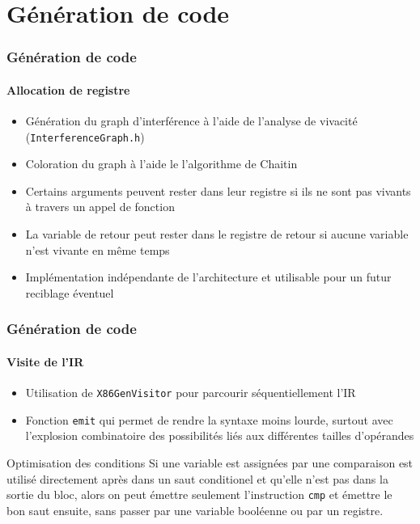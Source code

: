 \documentclass{beamer}
\begin{document}
\section{Génération de code}

\begin{frame}
    \frametitle{Génération de code}
    \framesubtitle{Allocation de registre}

    \begin{itemize}
        \item Génération du graph d'interférence à l'aide de l'analyse de vivacité (\lstinline{InterferenceGraph.h})
        \item Coloration du graph à l'aide le l'algorithme de Chaitin
        \item Certains arguments peuvent rester dans leur registre si ils ne sont pas vivants à
              travers un appel de fonction
        \item La variable de retour peut rester dans le registre de retour si aucune variable n'est 
              vivante en même temps
        \item Implémentation indépendante de l'architecture et utilisable pour un futur
              reciblage éventuel
    \end{itemize}
\end{frame}

\begin{frame}
    \frametitle{Génération de code}
    \framesubtitle{Visite de l'IR}

    \begin{itemize}
        \item Utilisation de \lstinline{X86GenVisitor} pour parcourir séquentiellement l'IR
        \item Fonction \lstinline{emit} qui permet de rendre la syntaxe moins lourde, surtout
              avec l'explosion combinatoire des possibilités liés aux différentes tailles d'opérandes
    \end{itemize}
    \pause
    \begin{block}{Optimisation des conditions}
        Si une variable est assignées par une comparaison est utilisé directement après
        dans un saut conditionel et qu'elle n'est pas dans la sortie du bloc, alors on
        peut émettre seulement l'instruction \lstinline{cmp} et émettre le bon saut
        ensuite, sans passer par une variable booléenne ou par un registre.
    \end{block}
\end{frame}
\end{document}
